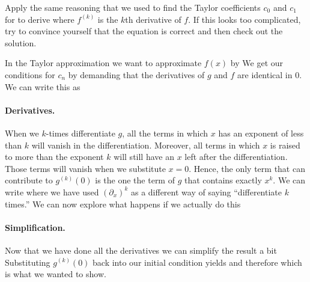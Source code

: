\label{exGeneratingTaylorFormula}Apply the same reasoning that we used to find the Taylor coefficients $c_0$ and $c_1$ for to derive 
where $f^{(k)}$ is the $k$th derivative of $f$. If this looks too complicated, try to convince yourself that the equation is correct and then check out the solution.  

\solution
In the Taylor approximation we want to approximate $f(x)$ by 
We get our conditions for $c_n$ by demanding that the derivatives of $g$ and $f$ are identical in 0. We can write this as
\paragraph{Derivatives.}When we $k$-times differentiate $g$, all the terms in which $x$ has an exponent of less than $k$ will vanish in the differentiation. Moreover, all terms in which $x$ is raised to more than the exponent $k$ will still have an $x$ left after the differentiation. Those terms will vanish when we substitute $x=0$. Hence, the only term that can contribute to $g^{(k)}(0)$ is the one the term of $g$ that contains exactly $x^k$. We can write 
where we have used $(\partial_x)^k$ as a different way of saying ``differentiate $k$ times.'' We can now explore what happens if we actually do this 
\paragraph{Simplification.}Now that we have done all the derivatives we can simplify the result a bit
Substituting $g^{(k)}(0)$ back into our initial condition yields
and therefore 
which is what we wanted to show. 

